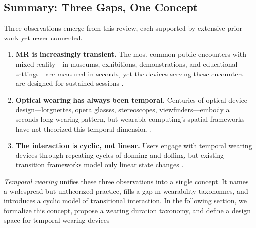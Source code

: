\subsection{Summary: Three Gaps, One Concept}

Three observations emerge from this review, each supported by extensive prior work yet never connected:

\begin{enumerate}
    \item \textbf{MR is increasingly transient.} The most common public encounters with mixed reality---in museums, exhibitions, demonstrations, and educational settings---are measured in seconds, yet the devices serving these encounters are designed for sustained sessions \cite{vomlehn2001exhibiting, koelle2020social, starner2001challenges}.
    \item \textbf{Optical wearing has always been temporal.} Centuries of optical device design---lorgnettes, opera glasses, stereoscopes, viewfinders---embody a seconds-long wearing pattern, but wearable computing's spatial frameworks have not theorized this temporal dimension \cite{gemperle1998wearability, zeagler2017where}.
    \item \textbf{The interaction is cyclic, not linear.} Users engage with temporal wearing devices through repeating cycles of donning and doffing, but existing transition frameworks model only linear state changes \cite{weiser1996calm, bakker2015peripheral, hubenschmid2025hybrid}.
\end{enumerate}

\textit{Temporal wearing} unifies these three observations into a single concept. It names a widespread but untheorized practice, fills a gap in wearability taxonomies, and introduces a cyclic model of transitional interaction. In the following section, we formalize this concept, propose a wearing duration taxonomy, and define a design space for temporal wearing devices.
